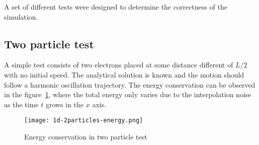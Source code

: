 A set of different tests were designed to determine the correctness of the
simulation.

\subsection{Two particle test}

A simple test consists of two electrons placed at some distance different of
$L/2$ with no initial speed. The analytical solution is known and the motion 
should follow a harmonic oscillation trajectory. The energy conservation can be 
observed in the figure~\ref{fig:1d-2particles-energy}, where the total energy 
only varies due to the interpolation noise as the time $t$ grows in the $x$ 
axis.
%
\begin{figure}[h]
	\centering
	\texttt{[image: 1d-2particles-energy.png]}
	\caption{Energy conservation in two particle test}
	\label{fig:1d-2particles-energy}
\end{figure}
